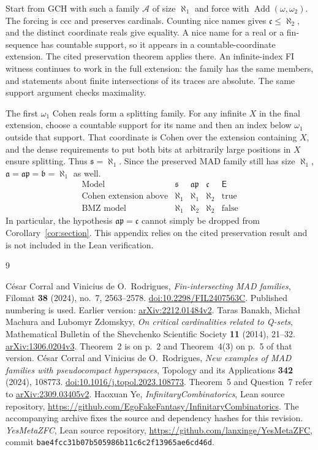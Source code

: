 \documentclass[11pt,letterpaper]{article}
\theoremstyle{definition}
\theoremstyle{remark}
\newcommand{\s}{\mathfrak{s}}
\newcommand{\bnum}{\mathfrak{b}}
\newcommand{\anum}{\mathfrak{a}}
\newcommand{\ap}{\mathfrak{ap}}
\newcommand{\cont}{\mathfrak{c}}
\newcommand{\A}{\mathcal{A}}
\newcommand{\E}{\mathsf{E}}
\begin{document}
Start from GCH with such a family $\A$ of size $\aleph_1$ and force with
$\operatorname{Add}(\omega,\omega_2)$. The forcing is ccc and preserves
cardinals. Counting nice names gives $\cont\leq\aleph_2$, and the distinct
coordinate reals give equality. A nice name for a real or a fin-sequence
has countable support, so it appears in a countable-coordinate extension.
The cited preservation theorem applies there. An infinite-index FI witness
continues to work in the full extension: the family has the same members,
and statements about finite intersections of its traces are absolute.
The same support argument checks maximality.

The first $\omega_1$ Cohen reals form a splitting family. For any infinite
$X$ in the final extension, choose a countable support for its name and
then an index below $\omega_1$ outside that support. That coordinate is
Cohen over the extension containing $X$, and the dense requirements to
put both bits at arbitrarily large positions in $X$ ensure splitting.
Thus $\s=\aleph_1$. Since the preserved MAD family still has size $\aleph_1$,
$\anum=\ap=\bnum=\aleph_1$ as well.
\[
\begin{array}{lcccc}
\text{Model} & \s & \ap & \cont & \E\\\hline
\text{Cohen extension above} & \aleph_1 & \aleph_1 & \aleph_2 & \text{true}\\
\text{BMZ model} & \aleph_1 & \aleph_2 & \aleph_2 & \text{false}
\end{array}
\]
In particular, the hypothesis $\ap=\cont$ cannot simply be dropped from
Corollary~\ref{cor:section}. This appendix relies on the cited preservation
result and is not included in the Lean verification.

\begin{thebibliography}{9}
\raggedright
{} C\'esar Corral and Vinicius de O.~Rodrigues,
\emph{Fin-intersecting MAD families}, Filomat \textbf{38} (2024), no.~7,
2563--2578. \href{https://doi.org/10.2298/FIL2407563C}{doi:10.2298/FIL2407563C}.
Published numbering is used. Earlier version:
\href{https://arxiv.org/abs/2212.01484v2}{arXiv:2212.01484v2}.
 Taras Banakh, Micha\l{} Machura and Lubomyr Zdomskyy,
\emph{On critical cardinalities related to Q-sets}, Mathematical Bulletin
of the Shevchenko Scientific Society \textbf{11} (2014), 21--32.
\href{https://arxiv.org/abs/1306.0204v3}{arXiv:1306.0204v3}.
Theorem~2 is on p.~2 and Theorem~4(3) on p.~5 of that version.
 C\'esar Corral and Vinicius de O.~Rodrigues,
\emph{New examples of MAD families with pseudocompact hyperspaces},
Topology and its Applications \textbf{342} (2024), 108773.
\href{https://doi.org/10.1016/j.topol.2023.108773}{doi:10.1016/j.topol.2023.108773}.
Theorem~5 and Question~7 refer to
\href{https://arxiv.org/abs/2309.03405v2}{arXiv:2309.03405v2}.
 Haoxuan Ye, \emph{InfinitaryCombinatorics}, Lean source repository,
\url{https://github.com/EgoFakeFantasy/InfinitaryCombinatorics}.
The accompanying archive fixes the source and dependency hashes for this revision.
 \emph{YesMetaZFC}, Lean source repository,
\url{https://github.com/lanxinge/YesMetaZFC}, commit
\texttt{bae4fcc31b07b505986b11c6c2f13965ae6cd46d}.
\end{thebibliography}
\end{document}
